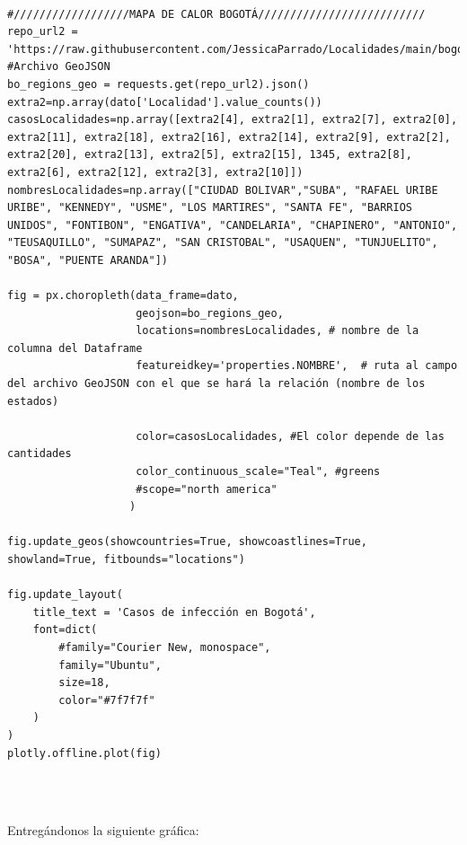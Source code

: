 \documentclass[conference,compsoc,onecolumn]{IEEEtran}
\begin{document}
\begin{lstlisting}

#//////////////////MAPA DE CALOR BOGOTÁ//////////////////////////
repo_url2 = 'https://raw.githubusercontent.com/JessicaParrado/Localidades/main/bogota_localidades.geojson' #Archivo GeoJSON
bo_regions_geo = requests.get(repo_url2).json()
extra2=np.array(dato['Localidad'].value_counts())
casosLocalidades=np.array([extra2[4], extra2[1], extra2[7], extra2[0], extra2[11], extra2[18], extra2[16], extra2[14], extra2[9], extra2[2], extra2[20], extra2[13], extra2[5], extra2[15], 1345, extra2[8], extra2[6], extra2[12], extra2[3], extra2[10]])
nombresLocalidades=np.array(["CIUDAD BOLIVAR","SUBA", "RAFAEL URIBE URIBE", "KENNEDY", "USME", "LOS MARTIRES", "SANTA FE", "BARRIOS UNIDOS", "FONTIBON", "ENGATIVA", "CANDELARIA", "CHAPINERO", "ANTONIO", "TEUSAQUILLO", "SUMAPAZ", "SAN CRISTOBAL", "USAQUEN", "TUNJUELITO", "BOSA", "PUENTE ARANDA"])

fig = px.choropleth(data_frame=dato,
                    geojson=bo_regions_geo,
                    locations=nombresLocalidades, # nombre de la columna del Dataframe
                    featureidkey='properties.NOMBRE',  # ruta al campo del archivo GeoJSON con el que se hará la relación (nombre de los estados)

                    color=casosLocalidades, #El color depende de las cantidades
                    color_continuous_scale="Teal", #greens
                    #scope="north america"
                   )

fig.update_geos(showcountries=True, showcoastlines=True, showland=True, fitbounds="locations")

fig.update_layout(
    title_text = 'Casos de infección en Bogotá',
    font=dict(
        #family="Courier New, monospace",
        family="Ubuntu",
        size=18,
        color="#7f7f7f"
    )
)
plotly.offline.plot(fig)
\end{lstlisting}
\\\

Entregándonos la siguiente gráfica:
\\\

\begin{figure}[htbp]
\centering
{}
\label{fig:lego}
\end{figure}
\\\
\end{document}
